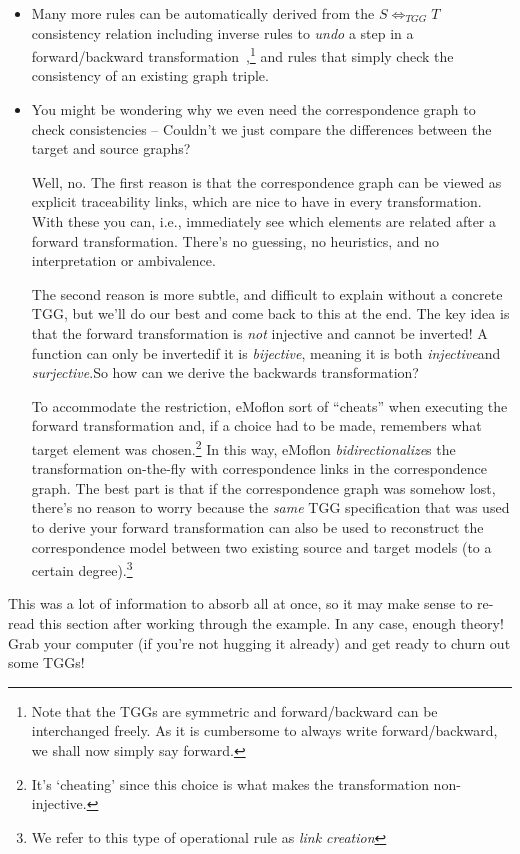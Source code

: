 \begin{itemize}

\item Many more rules can be automatically derived from the $S \Leftrightarrow_{TGG} T$ consistency relation including inverse rules to \emph{undo} a step in a
forward/backward transformation~\cite{LAVS_ICGT_2012},\footnote{Note
that the TGGs are symmetric and forward/backward can be interchanged freely.  As it is cumbersome to always write forward/backward, we shall now simply say
forward.} and rules that simply check the consistency of an existing graph triple.

\item You might be wondering why we even need the correspondence graph to check consistencies -- Couldn't we just compare the differences between the target and
source graphs?

Well, no. The first reason is that the correspondence graph can be viewed as explicit traceability links, which are nice to have in every transformation. With
these you can, i.e., immediately see which elements are related after a forward transformation. There's no guessing, no heuristics, and no
interpretation or ambivalence.

The second reason is more subtle, and difficult to explain without a concrete TGG, but we'll do our best and come back to this at the end. The key idea is that
the forward transformation is \emph{not} injective and cannot be inverted! A function can only be invertedif it is \emph{bijective}, meaning
it is both \emph{injective}and \emph{surjective}.So how can we derive the backwards transformation?

To accommodate the restriction, eMoflon sort of ``cheats'' when executing the forward transformation and, if a choice had to be made, remembers what target
element was chosen.\footnote{It's `cheating' since this choice is what makes the transformation non-injective.} In this way, eMoflon \emph{bidirectionalize}s
the transformation on-the-fly with correspondence links in the correspondence graph. The best part is that if the correspondence graph was somehow lost, there's
no reason to worry because the \emph{same} TGG specification that was used to derive your forward transformation can also be used to reconstruct the
correspondence model between two existing source and target models (to a certain degree).\footnote{We refer to this type of operational rule as \emph{link
creation}}

\end{itemize}
This was a lot of information to absorb all at once, so it may make sense to re-read this section after working through the example. In any case, enough theory!
Grab your computer (if you're not hugging it already) and get ready to churn out some TGGs!
